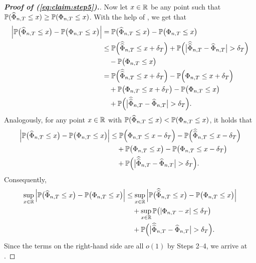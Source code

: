 \documentclass[12pt]{article}
\makeatletter
\renewcommand{\eqref}[1]{\tagform@{\ref{#1}}}
\makeatother
\begin{document}
\begin{proof}[\textnormal{\textbf{Proof of (\ref{eq:claim:step5}).}}]
Now let $x\in \mathbb{R}$ be any point such that $\mathbb{P}(\widehat{\Phi}_{n,T} \le x) \geq \mathbb{P}(\Phi_{n, T} \le x)$. With the help of \eqref{eq:lemmaA-step1}, we get that
\begin{align*}
\Big| \mathbb{P}\big(\widehat{\Phi}_{n, T} \le x\big) - \mathbb{P}\big(\Phi_{n,T} \le x\big) \Big| 
 & = \mathbb{P}\big(\widehat{\Phi}_{n, T} \le x\big) - \mathbb{P}\big(\Phi_{n,T} \le x\big) \\ 
 & \le \mathbb{P}\Big(\widehat{\widehat{\Phi}}_{n,T} \le x + \delta_{T}\Big) + \mathbb{P} \Big(\big|\widehat{\widehat{\Phi}}_{n,T} - \widehat{\Phi}_{n,T}\big| > \delta_{T} \Big) \\ 
 & \quad - \mathbb{P}\big(\Phi_{n,T} \le x\big)  \\
 & = \mathbb{P}\Big(\widehat{\widehat{\Phi}}_{n,T} \le x + \delta_{T}\Big) - \mathbb{P}\Big(\Phi_{n,T} \le x + \delta_{T}\Big)  \\
 & \quad +  \mathbb{P}\big(\Phi_{n,T} \le x + \delta_{T}\big)   - \mathbb{P}\big(\Phi_{n,T} \le x\big) \\ 
 & \quad + \mathbb{P} \Big(\big|\widehat{\widehat{\Phi}}_{n,T} - \widehat{\Phi}_{n,T}\big| > \delta_{T} \Big). 
\end{align*}
Analogously, for any point $x\in \mathbb{R}$ with $\mathbb{P}(\widehat{\Phi}_{n,T}\le x) < \mathbb{P}(\Phi_{n, T}\le x)$, it holds that 
\begin{align*}
\Big| \mathbb{P}\big(\widehat{\Phi}_{n, T} \le x\big) - \mathbb{P}\big(\Phi_{n,T} \le x\big) \Big| 
 & \le \mathbb{P}\Big( \Phi_{n,T} \le x - \delta_T \Big) - \mathbb{P}\Big(\widehat{\widehat{\Phi}}_{n,T} \le x - \delta_{T}\Big) \\
 & \quad + \mathbb{P}\big( \Phi_{n,T} \le x \big) - \mathbb{P}\big( \Phi_{n,T} \le x - \delta_T \big) \\
 & \quad + \mathbb{P} \Big(\big|\widehat{\widehat{\Phi}}_{n,T} - \widehat{\Phi}_{n,T}\big| > \delta_{T} \Big).  
\end{align*}
Consequently,  
\begin{align*}
\sup_{x \in \mathbb{R}} \Big| \mathbb{P}\big(\widehat{\Phi}_{n, T} \le x\big) - \mathbb{P}\big(\Phi_{n,T} \le x\big) \Big| 
 & \le \sup_{x \in \mathbb{R}} \Big| \mathbb{P}\big(\widehat{\widehat{\Phi}}_{n, T} \le x\big) - \mathbb{P}\big(\Phi_{n,T} \le x\big) \Big| \\
 & \quad + \sup_{x \in \mathbb{R}} \mathbb{P}\big( | \Phi_{n,T} - x | \le \delta_T \big) \\
 & \quad + \mathbb{P} \Big(\big|\widehat{\widehat{\Phi}}_{n,T} - \widehat{\Phi}_{n,T}\big| > \delta_{T} \Big). 
\end{align*}
Since the terms on the right-hand side are all $o(1)$ by Steps 2--4, we arrive at \eqref{eq:claim:step5}. 
\end{proof}
\end{document}
